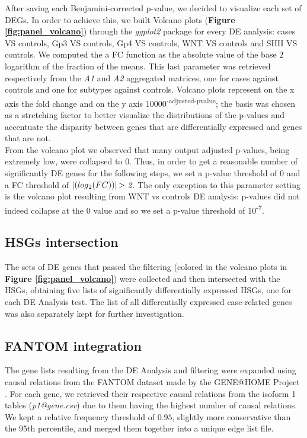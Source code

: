 \documentclass[10pt]{SelfArx} %
\begin{document}
After saving each Benjamini-corrected p-value, we decided to visualize each set of DEGs. In order to achieve this, we built Volcano plots (\textbf{Figure \ref{fig:panel_volcano}}) through the \textit{ggplot2} package for every DE analysis: cases VS controls, Gp3 VS controls, Gp4 VS controls, WNT VS controls and SHH VS controls. We computed the a FC function as the absolute value of the base $2$ logarithm of the fraction of the means. This last parameter was retrieved respectively from the \textit{A1} and \textit{A2} aggregated matrices, one for cases against controls and one for subtypes against controls.
Volcano plots represent on the x axis the fold change and on the y axis 10000\textsuperscript{-adjusted-pvalue}; the basis was chosen as a stretching factor to better visualize the distributions of the p-values and accentuate the disparity between genes that are differentially expressed and genes that are not. \\
From the volcano plot we observed that many output adjusted p-values, being extremely low, were collapsed to $0$. Thus, in order to get a reasonable number of significantly DE genes for the following steps, we set a p-value threshold of $0$ and a FC threshold of
$\left | (log\textsubscript{2}(FC)) \right | \textit{$>$ 2}$. The only exception to this parameter setting is the volcano plot resulting from WNT vs controls DE analysis: p-values did not indeed collapse at the 0 value and so we set a p-value threshold of 10\textsuperscript{-7}.\\

\subsection{HSGs intersection}\label{sec:HSGs_intersection}
The sets of DE genes that passed the filtering (colored in the volcano plots in \textbf{Figure \ref{fig:panel_volcano}}) were collected and then intersected with the HSGs, obtaining five lists of significantly differentially expressed HSGs, one for each DE Analysis test. The list of all differentially expressed case-related genes was also separately kept for further investigation.\\


\subsection{FANTOM integration}\label{sec:fantom_integration}
The gene lists resulting from the DE Analysis and filtering were expanded using causal relations from the FANTOM dataset \cite{fantom5} made by the GENE@HOME Project \cite{asnicar2015tn}.
For each gene, we retrieved their respective causal relations from the isoform 1 tables (\textit{p1@gene.csv}) due to them having the highest number of causal relations. We kept a relative frequency threshold of $0.95$, slightly more conservative than the 95th percentile, and merged them together into a unique edge list file.
\end{document}
